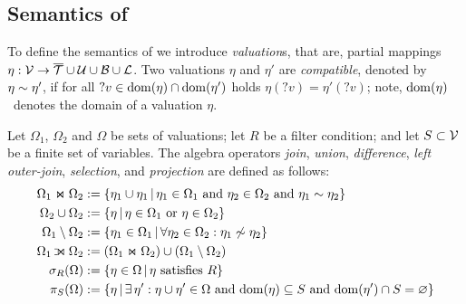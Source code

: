 
\subsection{{\RDFplus} Semantics of {\SPARQLplus}}
	To define the semantics of {\SPARQLplus} we introduce
\emph{valuation}s, that are, partial mappings $\eta : \mathcal{V} \rightarrow \overline{\mathcal{T}} \cup \mathcal{U} \cup \mathcal{B} \cup \mathcal{L}$.
Two valuations $\eta$ and $\eta'$ are \emph{compatible}, denoted by $\eta \sim \eta'$, if for all $?v \in \mathrm{dom}(\eta) \cap \mathrm{dom}(\eta')$ holds $\eta(?v) = \eta'(?v)$; note,
	$\mathrm{dom}(\eta)$~denotes %
the domain of a valuation $\eta$.

Let $\Omega_1$, $\Omega_2$ and $\Omega$ be sets of valuations; let $R$ be a filter condition; and let $S \subset \mathcal{V}$ be a finite set of variables. The algebra operators \emph{join}, \emph{union}, \emph{difference}, \emph{left outer-join}, \emph{selection}, and \emph{projection} are defined as follows:
\begin{align*}
	\Omega_1 \Join \Omega_2 & := \lbrace \eta_1 \cup \eta_1 \,|\, \eta_1 \in \Omega_1 \text{ and } \eta_2 \in \Omega_2 \text{ and } \eta_1 \sim \eta_2 \rbrace \\
	\Omega_2 \cup \Omega_2 & := \lbrace \eta \,|\, \eta \in \Omega_1 \text{ or } \eta \in \Omega_2 \rbrace \\
	\Omega_1 \setminus \Omega_2 & := \lbrace \eta_1 \in \Omega_1 \,|\, \forall \eta_2 \in \Omega_2 : \eta_1 \not\sim \eta_2 \rbrace \\
	\Omega_1 \LJoin \Omega_2 &:= \left( \Omega_1 \Join \Omega_2 \right) \cup \left( \Omega_1 \setminus \Omega_2 \right) \\
	\sigma_R ( \Omega ) &:= \lbrace \eta \in \Omega \,|\, \eta \text{ satisfies } R \rbrace \\
	\pi_S ( \Omega ) &:= \lbrace \eta \,|\, \exists \, \eta' : \eta \cup \eta' \in \Omega \text{ and } \fctDom{\eta} \subseteq S \text{ and } \fctDom{\eta'} \cap S = \emptyset \rbrace
\end{align*}


